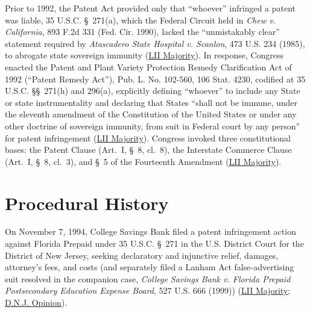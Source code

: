 \documentclass[12pt]{article}
\begin{document}
Prior to 1992, the Patent Act provided only that ``whoever'' infringed a patent was liable, 35 U.S.C. \S~271(a), which the Federal Circuit held in \textit{Chew v. California}, 893 F.2d 331 (Fed. Cir. 1990), lacked the ``unmistakably clear'' statement required by \textit{Atascadero State Hospital v. Scanlon}, 473 U.S. 234 (1985), to abrogate state sovereign immunity (\href{https://www.law.cornell.edu/supct/html/98-531.ZO.html}{LII Majority}). In response, Congress enacted the Patent and Plant Variety Protection Remedy Clarification Act of 1992 (``Patent Remedy Act''), Pub. L. No. 102-560, 106 Stat. 4230, codified at 35 U.S.C. \S\S~271(h) and 296(a), explicitly defining ``whoever'' to include any State or state instrumentality and declaring that States ``shall not be immune, under the eleventh amendment of the Constitution of the United States or under any other doctrine of sovereign immunity, from suit in Federal court by any person'' for patent infringement (\href{https://www.law.cornell.edu/supct/html/98-531.ZO.html}{LII Majority}). Congress invoked three constitutional bases: the Patent Clause (Art.~I, \S~8, cl.~8), the Interstate Commerce Clause (Art.~I, \S~8, cl.~3), and \S~5 of the Fourteenth Amendment (\href{https://www.law.cornell.edu/supct/html/98-531.ZO.html}{LII Majority}).

\section{Procedural History}

On November 7, 1994, College Savings Bank filed a patent infringement action against Florida Prepaid under 35 U.S.C. \S~271 in the U.S. District Court for the District of New Jersey, seeking declaratory and injunctive relief, damages, attorney's fees, and costs (and separately filed a Lanham Act false-advertising suit resolved in the companion case, \textit{College Savings Bank v. Florida Prepaid Postsecondary Education Expense Board}, 527 U.S. 666 (1999)) (\href{https://www.law.cornell.edu/supct/html/98-531.ZO.html}{LII Majority}; \href{https://law.justia.com/cases/federal/district-courts/FSupp/948/400/2098999/}{D.N.J. Opinion}).
\end{document}
